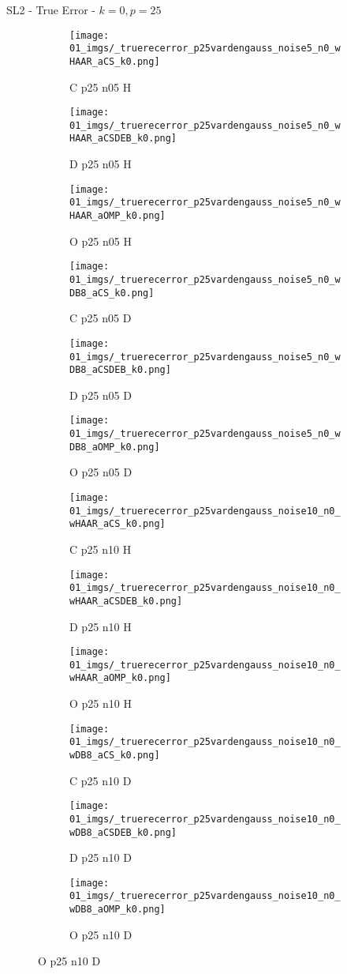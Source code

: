\begin{frame}{SL2 - True Error - $k=0,p=25$}{}
\begin{figure}
\begin{subfigure}{0.13\textwidth}
\texttt{[image: 01\_imgs/\_truerecerror\_p25vardengauss\_noise5\_n0\_wHAAR\_aCS\_k0.png]}
\caption*{\tiny C p25 n05 H}
\end{subfigure}
\begin{subfigure}{0.13\textwidth}
\texttt{[image: 01\_imgs/\_truerecerror\_p25vardengauss\_noise5\_n0\_wHAAR\_aCSDEB\_k0.png]}
\caption*{\tiny D p25 n05 H}
\end{subfigure}
\begin{subfigure}{0.13\textwidth}
\texttt{[image: 01\_imgs/\_truerecerror\_p25vardengauss\_noise5\_n0\_wHAAR\_aOMP\_k0.png]}
\caption*{\tiny O p25 n05 H}
\end{subfigure}
\begin{subfigure}{0.13\textwidth}
\texttt{[image: 01\_imgs/\_truerecerror\_p25vardengauss\_noise5\_n0\_wDB8\_aCS\_k0.png]}
\caption*{\tiny C p25 n05 D}
\end{subfigure}
\begin{subfigure}{0.13\textwidth}
\texttt{[image: 01\_imgs/\_truerecerror\_p25vardengauss\_noise5\_n0\_wDB8\_aCSDEB\_k0.png]}
\caption*{\tiny D p25 n05 D}
\end{subfigure}
\begin{subfigure}{0.13\textwidth}
\texttt{[image: 01\_imgs/\_truerecerror\_p25vardengauss\_noise5\_n0\_wDB8\_aOMP\_k0.png]}
\caption*{\tiny O p25 n05 D}
\end{subfigure}

\vspace{5pt}

\begin{subfigure}{0.13\textwidth}
\texttt{[image: 01\_imgs/\_truerecerror\_p25vardengauss\_noise10\_n0\_wHAAR\_aCS\_k0.png]}
\caption*{\tiny C p25 n10 H}
\end{subfigure}
\begin{subfigure}{0.13\textwidth}
\texttt{[image: 01\_imgs/\_truerecerror\_p25vardengauss\_noise10\_n0\_wHAAR\_aCSDEB\_k0.png]}
\caption*{\tiny D p25 n10 H}
\end{subfigure}
\begin{subfigure}{0.13\textwidth}
\texttt{[image: 01\_imgs/\_truerecerror\_p25vardengauss\_noise10\_n0\_wHAAR\_aOMP\_k0.png]}
\caption*{\tiny O p25 n10 H}
\end{subfigure}
\begin{subfigure}{0.13\textwidth}
\texttt{[image: 01\_imgs/\_truerecerror\_p25vardengauss\_noise10\_n0\_wDB8\_aCS\_k0.png]}
\caption*{\tiny C p25 n10 D}
\end{subfigure}
\begin{subfigure}{0.13\textwidth}
\texttt{[image: 01\_imgs/\_truerecerror\_p25vardengauss\_noise10\_n0\_wDB8\_aCSDEB\_k0.png]}
\caption*{\tiny D p25 n10 D}
\end{subfigure}
\begin{subfigure}{0.13\textwidth}
\texttt{[image: 01\_imgs/\_truerecerror\_p25vardengauss\_noise10\_n0\_wDB8\_aOMP\_k0.png]}
\caption*{\tiny O p25 n10 D}
\end{subfigure}


\end{figure}
\end{frame}
